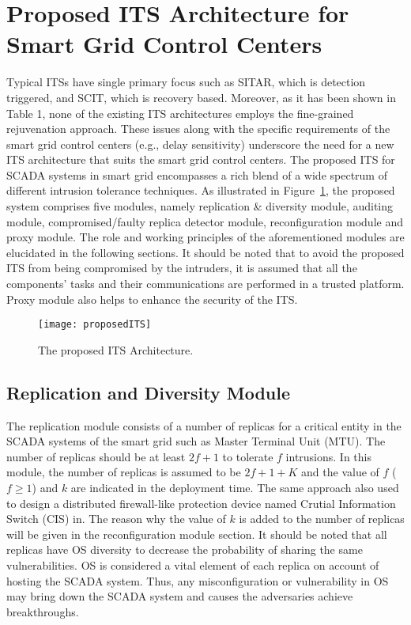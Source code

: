 \documentclass[preprint,number,12pt]{elsarticle}
\begin{document}
\section{Proposed ITS Architecture for Smart Grid Control Centers}
\label{sec: proposed architecture}
Typical ITSs have single primary focus such as SITAR, which is detection triggered, and SCIT, which is recovery based. Moreover, as it has been shown in Table 1, none of the existing ITS architectures employs the fine-grained rejuvenation approach. These issues along with the specific requirements of the smart grid control centers (e.g., delay sensitivity) underscore the need for a new ITS architecture that suits the smart grid control centers. The proposed ITS for SCADA systems in smart grid encompasses a rich blend of a wide spectrum of different intrusion tolerance techniques. As illustrated in Figure~\ref{fig:proposedITS}, the proposed system comprises five modules, namely replication \& diversity module, auditing module, compromised/faulty replica detector module, reconfiguration module and proxy module. The role and working principles of the aforementioned modules are elucidated in the following sections. It should be noted that to avoid the proposed ITS from being compromised by the intruders, it is assumed that all the components' tasks and their communications are performed in a trusted platform. Proxy module also helps to enhance the security of the ITS.
\begin{figure}[!t]
\centering
\texttt{[image: proposedITS]}
\caption{The proposed ITS Architecture.}
\label{fig:proposedITS}
\end{figure}
\subsection{Replication and Diversity Module}
The replication module consists of a number of replicas for a critical entity in the SCADA systems of the smart grid such as Master Terminal Unit (MTU). The number of replicas should be at least $2f + 1$ to tolerate $f$ intrusions. In this module, the number of replicas is assumed to be $2f + 1 + K$ and the value of $f$ ($f\geqslant1$) and $k$ are indicated in the deployment time. The same approach also used to design a distributed firewall-like protection device named Crutial Information Switch (CIS) in\citep{Bessani2008c}. The reason why the value of $k$ is added to the number of replicas will be given in the reconfiguration module section. It should be noted that all replicas have OS diversity to decrease the probability of sharing the same vulnerabilities. OS is considered a vital element of each replica on account of hosting the SCADA system. Thus, any misconfiguration or vulnerability in OS may bring down the SCADA system and causes the adversaries achieve breakthroughs\citep{Nicholson2012418}.
\end{document}

